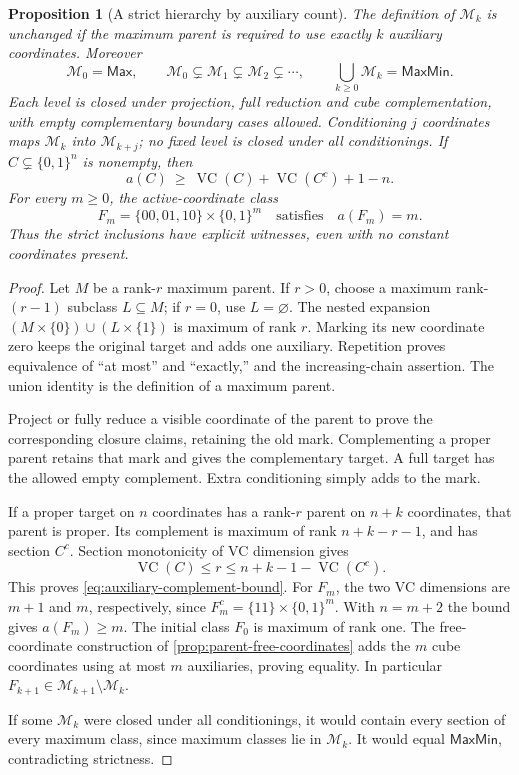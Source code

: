 \documentclass[11pt]{article}
\newtheorem{proposition}{Proposition}[section]
\theoremstyle{definition}
\newcommand{\bits}{\{0,1\}}
\newcommand{\MaxMin}{\mathsf{MaxMin}}
\begin{document}
\begin{proposition}[A strict hierarchy by auxiliary count]
\label{prop:auxiliary-hierarchy}
The definition of $\mathcal M_k$ is unchanged if the maximum parent is
required to use exactly $k$ auxiliary coordinates. Moreover
\[
 \mathcal M_0=\mathsf{Max},\qquad
 \mathcal M_0\subsetneq\mathcal M_1\subsetneq\mathcal M_2
 \subsetneq\cdots,\qquad
 \bigcup_{k\ge0}\mathcal M_k=\MaxMin.
\]
Each level is closed under projection, full reduction and cube complementation,
with empty complementary boundary cases allowed. Conditioning $j$ coordinates
maps $\mathcal M_k$ into $\mathcal M_{k+j}$; no fixed level is closed under
all conditionings. If $C\subsetneq\bits^n$ is nonempty, then
\begin{equation}\label{eq:auxiliary-complement-bound}
 a(C)\ \ge\ \operatorname{VC}(C)+\operatorname{VC}(C^c)+1-n.
\end{equation}
For every $m\ge0$, the active-coordinate class
\[
 F_m=\{00,01,10\}\times\bits^m
 \quad\text{satisfies}\quad a(F_m)=m.
\]
Thus the strict inclusions have explicit witnesses, even with no constant
coordinates present.
\end{proposition}
\begin{proof}
Let $M$ be a rank-$r$ maximum parent. If $r>0$, choose a maximum
rank-$(r-1)$ subclass $L\subseteq M$; if $r=0$, use $L=\varnothing$.
The nested expansion $(M\times\{0\})\cup(L\times\{1\})$ is maximum
of rank $r$. Marking its new coordinate zero keeps the original target
and adds one auxiliary. Repetition proves equivalence of ``at most'' and
``exactly,'' and the increasing-chain assertion. The union identity is
the definition of a maximum parent.

Project or fully reduce a visible coordinate of the parent to prove the
corresponding closure claims, retaining the old mark. Complementing a proper
parent retains that mark and gives the complementary target. A full target
has the allowed empty complement. Extra conditioning simply adds to the mark.

If a proper target on $n$ coordinates has a rank-$r$ parent on $n+k$
coordinates, that parent is proper. Its complement is maximum of rank
$n+k-r-1$, and has section $C^c$. Section monotonicity of VC dimension gives
\[
 \operatorname{VC}(C)\le r\le n+k-1-\operatorname{VC}(C^c).
\]
This proves \eqref{eq:auxiliary-complement-bound}.
For $F_m$, the two VC dimensions are $m+1$ and $m$, respectively,
since $F_m^c=\{11\}\times\bits^m$. With $n=m+2$ the bound gives
$a(F_m)\ge m$. The initial class $F_0$ is maximum of rank one.
The free-coordinate construction of \cref{prop:parent-free-coordinates}
adds the $m$ cube coordinates using at most $m$ auxiliaries, proving equality.
In particular $F_{k+1}\in\mathcal M_{k+1}\setminus\mathcal M_k$.

If some $\mathcal M_k$ were closed under all conditionings, it would
contain every section of every maximum class, since maximum classes lie
in $\mathcal M_k$. It would equal $\MaxMin$, contradicting strictness.
\end{proof}
\end{document}
